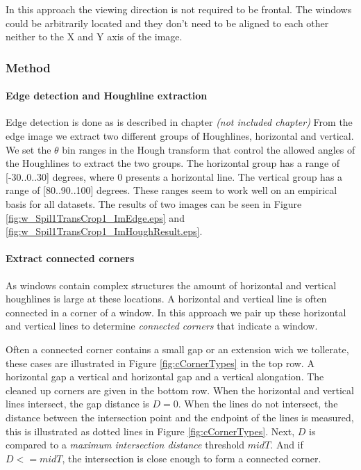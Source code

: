 In this approach the viewing direction is not required to be frontal.
The windows could be arbitrarily located and they don't need
to be aligned to each other neither to the X and Y axis of the image.

\subsubsection{Method}
\paragraph{Edge detection and Houghline extraction}
Edge detection is done as is described in chapter 
\emph{(not included chapter)} %
From the edge image we extract two different groups of Houghlines, horizontal and 
vertical.  We set the $\theta$ bin ranges in the Hough transform that control the
allowed angles of the Houghlines to extract the two groups. The horizontal group
has a range of [-30..0..30] degrees, where 0 presents a horizontal line. The vertical
group has a range of [80..90..100] degrees. These ranges seem
to work well on an empirical basis for all datasets.
The results of two images can be seen in Figure \ref{fig:w_Spil1TransCrop1_ImEdge.eps} and
 \ref{fig:w_Spil1TransCrop1_ImHoughResult.eps}.

\paragraph{Extract connected corners}
 As windows contain complex structures
the amount of horizontal and vertical houghlines is large at these locations.
A horizontal and vertical line is often connected in a corner of a window.  In
this approach we pair up these horizontal and vertical lines to determine
\emph{connected corners} that indicate a window.

Often a connected corner contains a small gap or an extension wich we tollerate,
these cases are illustrated in Figure \ref{fig:cCornerTypes} in the top row.
A horizontal gap a vertical and horizontal gap and a vertical alongation. The
cleaned up corners are given in the bottom row.  When the horizontal and
vertical lines intersect, the gap distance is $D=0$.  When the lines do not
intersect, the distance between the intersection point and the endpoint of the
lines is measured, this is illustrated as dotted lines in Figure
\ref{fig:cCornerTypes}.  Next, $D$ is compared to a \emph{maximum intersection
distance} threshold $midT$.  And if $D<=midT$, the intersection is close enough
to form a connected corner.\\

